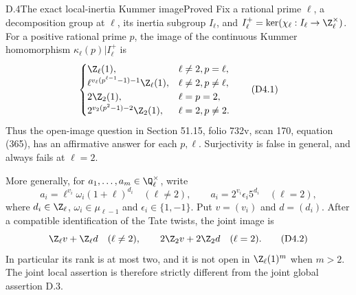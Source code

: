 \begin{statement}{D.4}{The exact local-inertia Kummer image}{Proved}
Fix a rational prime $\ell$, a decomposition group at $\ell$, its
inertia subgroup $I_\ell$, and
$I_\ell^+=\ker(\chi_\ell:I_\ell\to\Z_\ell^\times)$.
For a positive rational prime $p$, the image of the continuous Kummer
homomorphism $\kappa_\ell(p)|I_\ell^+$ is
\[
\begin{cases}
 \Z_\ell(1),&\ell\ne2, p=\ell,\\
 \ell^{v_\ell(p^{\ell-1}-1)-1}\Z_\ell(1),&\ell\ne2, p\ne\ell,\\
 2\Z_2(1),&\ell=p=2,\\
 2^{v_2(p^2-1)-2}\Z_2(1),&\ell=2, p\ne2.
\end{cases}
\tag{D4.1}
\]
Thus the open-image question in Section 51.15, folio 732v, scan 170,
equation (365), has an affirmative answer for each $p,\ell$.
Surjectivity is false in general, and always fails at $\ell=2$.

More generally, for $a_1,\ldots,a_m\in\Q_\ell^\times$, write
\[
 a_i=\ell^{v_i}\omega_i(1+\ell)^{d_i}\quad(\ell\ne2),
 \qquad a_i=2^{v_i}\epsilon_i5^{d_i}\quad(\ell=2),
\]
where $d_i\in\Z_\ell$, $\omega_i\in\mu_{\ell-1}$ and
$\epsilon_i\in\{1,-1\}$. Put $v=(v_i)$ and $d=(d_i)$.
After a compatible identification of the Tate twists, the joint image is
\[
 \Z_\ell v+\Z_\ell d\quad(\ell\ne2),
 \qquad 2\Z_2v+2\Z_2d\quad(\ell=2).
\tag{D4.2}
\]
In particular its rank is at most two, and it is not open in
$\Z_\ell(1)^m$ when $m>2$. The joint local assertion is therefore
strictly different from the joint global assertion D.3.
\end{statement}
